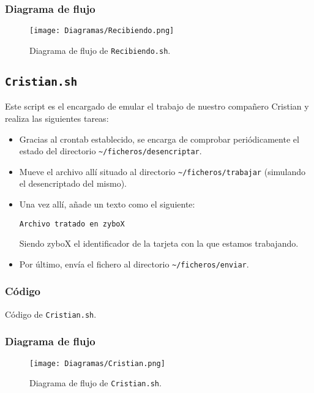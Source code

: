 \documentclass[12pt,letterpaper]{article}
\begin{document}
\newpage
\subsubsection{Diagrama de flujo}
\begin{figure}[h]
	\centering
	\texttt{[image: Diagramas/Recibiendo.png]}
	\caption{Diagrama de flujo de \texttt{Recibiendo.sh}.}
	\label{Diagrama de flujo de Recibiendo.sh}
\end{figure}

\newpage
\subsection{\texttt{Cristian.sh}}
Este script es el encargado de emular el trabajo de nuestro compañero Cristian y realiza las siguientes tareas:
\begin{itemize}
	\item Gracias al crontab establecido, se encarga de comprobar periódicamente el estado del directorio \texttt{\textasciitilde/ficheros/desencriptar}.
	\item Mueve el archivo allí situado al directorio \texttt{\textasciitilde/ficheros/trabajar} (simulando el desencriptado del mismo).
	\item Una vez allí, añade un texto como el siguiente:
	\begin{center}
		\texttt{Archivo tratado en zyboX}
	\end{center}	
	Siendo zyboX el identificador de la tarjeta con la que estamos trabajando.
	\item Por último, envía el fichero al directorio \texttt{\textasciitilde/ficheros/enviar}.
\end{itemize}

\subsubsection{Código}

\begin{center}
	Código de \texttt{Cristian.sh}.
\end{center}

\subsubsection{Diagrama de flujo}
\begin{figure}[h]
	\centering
	\texttt{[image: Diagramas/Cristian.png]}
	\caption{Diagrama de flujo de \texttt{Cristian.sh}.}
	\label{Diagrama de flujo de Cristian.sh}
\end{figure}
\end{document}
